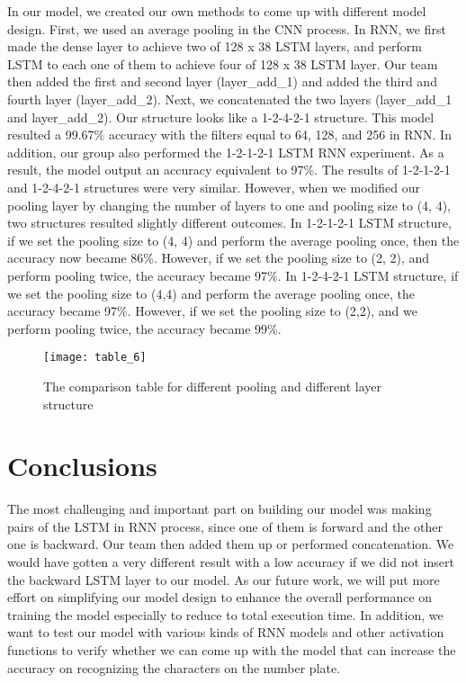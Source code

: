 \documentclass[conference]{IEEEtran}
\begin{document}
In our model, we created our own methods to come up with different model design. First, we used an average pooling in the CNN process. In RNN, we first made the dense layer to achieve two of 128 x 38 LSTM layers, and perform LSTM to each one of them to achieve four of 128 x 38 LSTM layer. Our team then added the first and second layer (layer\_add\_1) and added the third and fourth layer (layer\_add\_2). Next, we concatenated the two layers (layer\_add\_1 and layer\_add\_2). Our structure looks like a 1-2-4-2-1 structure. This model resulted a 99.67\% accuracy with the filters equal to 64, 128, and 256 in RNN.
In addition, our group also performed the 1-2-1-2-1 LSTM RNN experiment. As a result, the model output an accuracy equivalent to 97\%. The results of 1-2-1-2-1 and 1-2-4-2-1 structures were very similar. However, when we modified our pooling layer by changing the number of layers to one and pooling size to (4, 4), two structures resulted slightly different outcomes.
In 1-2-1-2-1 LSTM structure, if we set the pooling size to (4, 4) and perform the average pooling once, then the accuracy now became 86\%. However, if we set the pooling size to (2, 2), and perform pooling twice, the accuracy became 97\%.
In 1-2-4-2-1 LSTM structure, if we set the pooling size to (4,4) and perform the average pooling once, the accuracy became 97\%. However, if we set the pooling size to (2,2), and we perform pooling twice, the accuracy became 99\%.

\begin{figure}[H]
\centering
\texttt{[image: table\_6]}
\caption{The comparison table for different pooling and different layer structure}
\end{figure}

\section{Conclusions}
The most challenging and important part on building our model was making pairs of the LSTM in RNN process, since one of them is forward and the other one is backward. Our team then added them up or performed concatenation. We would have gotten a very different result with a low accuracy if we did not insert the backward LSTM layer to our model. As our future work, we will put more effort on simplifying our model design to enhance the overall performance on training the model especially to reduce to total execution time. In addition, we want to test our model with various kinds of RNN models and other activation functions to verify whether we can come up with the model that can increase the accuracy on recognizing the characters on the number plate.
\end{document}
